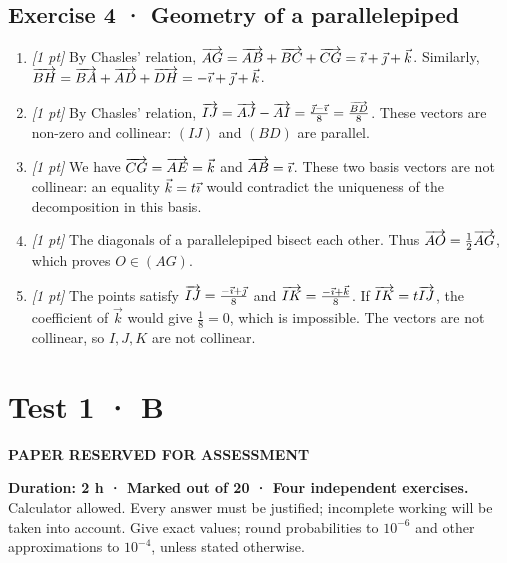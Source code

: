 \subsection*{Exercise 4 · Geometry of a parallelepiped}\begin{enumerate}

\item \textit{[1 pt]} By Chasles' relation, $\overrightarrow{AG}=\overrightarrow{AB}+\overrightarrow{BC}+\overrightarrow{CG}=\vec{\imath} +\vec{\jmath} +\vec k$. Similarly, $\overrightarrow{BH}=\overrightarrow{BA}+\overrightarrow{AD}+\overrightarrow{DH}=-\vec{\imath} +\vec{\jmath} +\vec k$.

\item \textit{[1 pt]} By Chasles' relation, $\overrightarrow{IJ}=\overrightarrow{AJ}-\overrightarrow{AI}=\frac{\vec{\jmath} -\vec{\imath} }{8}=\frac{\overrightarrow{BD}}{8}$. These vectors are non-zero and collinear: $(IJ)$ and $(BD)$ are parallel.

\item \textit{[1 pt]} We have $\overrightarrow{CG}=\overrightarrow{AE}=\vec k$ and $\overrightarrow{AB}=\vec{\imath} $. These two basis vectors are not collinear: an equality $\vec k=t\vec{\imath} $ would contradict the uniqueness of the decomposition in this basis.

\item \textit{[1 pt]} The diagonals of a parallelepiped bisect each other. Thus $\overrightarrow{AO}=\frac12\overrightarrow{AG}$, which proves $O\in(AG)$.

\item \textit{[1 pt]} The points satisfy $\overrightarrow{IJ}=\frac{-\vec{\imath} +\vec{\jmath} }{8}$ and $\overrightarrow{IK}=\frac{-\vec{\imath} +\vec k}{8}$. If $\overrightarrow{IK}=t\overrightarrow{IJ}$, the coefficient of $\vec k$ would give $\frac{1}{8}=0$, which is impossible. The vectors are not collinear, so $I,J,K$ are not collinear.

\end{enumerate}

\fi

\fi

\ifprof

\clearpage{}\label{sujet:1-4}

\section*{Test 1 · B}

{\sffamily\bfseries\color{amber}PAPER RESERVED FOR ASSESSMENT\par}

\textbf{Duration: 2 h · Marked out of 20 · Four independent exercises.}\\Calculator allowed. Every answer must be justified; incomplete working will be taken into account. Give exact values; round probabilities to $10^{-6}$ and other approximations to $10^{-4}$, unless stated otherwise.

